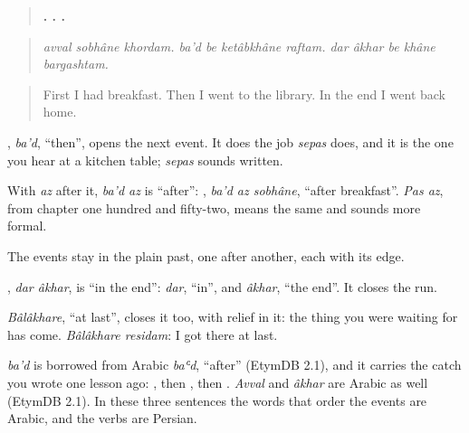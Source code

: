 \begin{grammarlens}[title={Grammar Lens: three events, in order}]
\begin{quote}
\textbf{  .    .     .}
\end{quote}

\begin{quote}
\emph{avval sobhâne khordam. ba'd be ketâbkhâne raftam. dar âkhar be khâne bargashtam.}
\end{quote}

\begin{quote}
First I had breakfast. Then I went to the library. In the end I went back home.
\end{quote}

\textbf{}, \emph{ba'd}, \textquotedblleft{}then\textquotedblright{}, opens the next event. It does the job \emph{sepas} does, and it is the one you hear at a kitchen table; \emph{sepas} sounds written.

With \emph{az} after it, \emph{ba'd az} is \textquotedblleft{}after\textquotedblright{}: \textbf{  }, \emph{ba'd az sobhâne}, \textquotedblleft{}after breakfast\textquotedblright{}. \emph{Pas az}, from chapter one hundred and fifty-two, means the same and sounds more formal.

The events stay in the plain past, one after another, each with its edge.
\end{grammarlens}

\begin{grammarlens}[title={Grammar Lens: in the end, and at last}]
\textbf{ }, \emph{dar âkhar}, is \textquotedblleft{}in the end\textquotedblright{}: \emph{dar}, \textquotedblleft{}in\textquotedblright{}, and \emph{âkhar}, \textquotedblleft{}the end\textquotedblright{}. It closes the run.

\emph{Bâlâkhare}, \textquotedblleft{}at last\textquotedblright{}, closes it too, with relief in it: the thing you were waiting for has come. \emph{Bâlâkhare residam}: I got there at last.
\end{grammarlens}

\begin{cousinweb}
\emph{ba'd} is borrowed from Arabic \emph{baʿd}, \textquotedblleft{}after\textquotedblright{} (EtymDB 2.1), and it carries the catch you wrote one lesson ago: \textbf{}, then \textbf{}, then \textbf{}. \emph{Avval} and \emph{âkhar} are Arabic as well (EtymDB 2.1). In these three sentences the words that order the events are Arabic, and the verbs are Persian.
\end{cousinweb}

